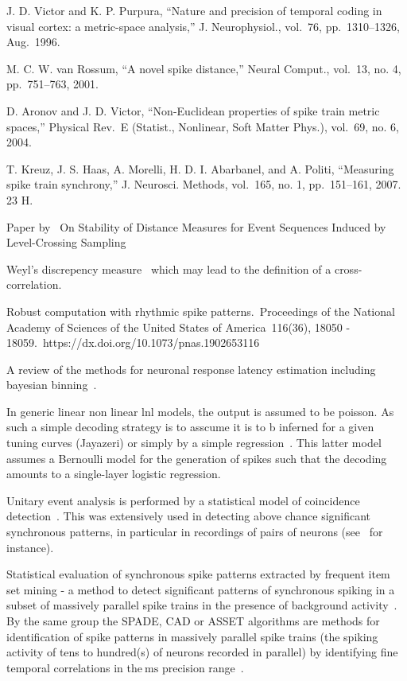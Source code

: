 \documentclass[brainsci, %
               review,submit,pdftex,moreauthors%
               ]{Definitions/mdpi}
\newcommand{\ms}{\si{\milli\second}}%
\begin{document}
J. D. Victor and K. P. Purpura, ``Nature and precision of temporal coding in visual cortex: a metric-space analysis,'' J. Neurophysiol., vol.~76, pp.~1310--1326, Aug.~1996.

M. C. W. van Rossum, ``A novel spike distance,'' Neural Comput., vol.~13, no. 4, pp.~751--763, 2001. 

D. Aronov and J. D. Victor, ``Non-Euclidean properties of spike train metric spaces,'' Physical Rev.~E (Statist., Nonlinear, Soft Matter Phys.), vol.~69, no. 6, 2004.

T. Kreuz, J. S. Haas, A. Morelli, H. D. I. Abarbanel, and A. Politi, ``Measuring spike train synchrony,'' J. Neurosci. Methods, vol.~165, no. 1, pp.~151--161, 2007. 23 H.

Paper by~\citep{moser_stability_2014} On Stability of Distance Measures for Event Sequences Induced by Level-Crossing Sampling

Weyl's discrepency measure~\citep{weyl_ber_1916} which may lead to the definition of a cross-correlation.

Robust computation with rhythmic spike patterns.~Proceedings of the National Academy of Sciences of the United States of America~116(36), 18050 - 18059.~https://dx.doi.org/10.1073/pnas.1902653116

A review of the methods for neuronal response latency estimation including bayesian binning~\citep{levakova_review_2015}.



In generic linear non linear lnl models, the output is assumed to be poisson. As such a simple decoding strategy is to asscume it is to b inferned for a given tuning curves (Jayazeri) or simply by a simple regression~\citep{berens_fast_2012}. This latter model assumes a Bernoulli model for the generation of spikes such that the decoding amounts to a single-layer logistic regression.

Unitary event analysis is performed by a statistical model of coincidence detection~\citep{grun_unitary_2010}. This was extensively used in detecting above chance significant synchronous patterns, in particular in recordings of pairs of neurons (see~\citep{riehle_spike_1997} for instance).

Statistical evaluation of synchronous spike patterns extracted by frequent item set mining - a method to detect significant patterns of synchronous spiking in a subset of massively parallel spike trains in the presence of background activity~\citep{torre_statistical_2013}. By the same group the SPADE, CAD or ASSET algorithms are methods for identification of spike patterns in massively parallel spike trains (the spiking activity of tens to hundred(s) of neurons recorded in parallel) by identifying fine temporal correlations in the$~\ms$ precision range~\citep{quaglio_methods_2018}.
\end{document}
